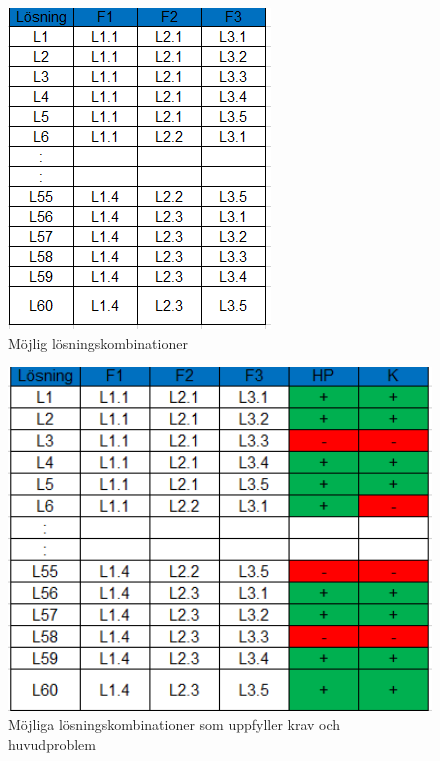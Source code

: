 \documentclass[11pt, a4paper]{report}
\begin{document}
\begin{figure}[H]
	\begin{center}
		\includegraphics [angle=0]{Losningsforslag.PNG}
		\caption{Möjlig lösningskombinationer }
		\label{fig:mojligalosningar}
	\end{center}
\end{figure}


\begin{figure}[H]
	\begin{center}
		\includegraphics [width=12cm,angle=0]{HPK.PNG}
		\caption{Möjliga lösningskombinationer som uppfyller krav och huvudproblem }
		\label{fig:hpk}
	\end{center}
\end{figure}
\end{document}
